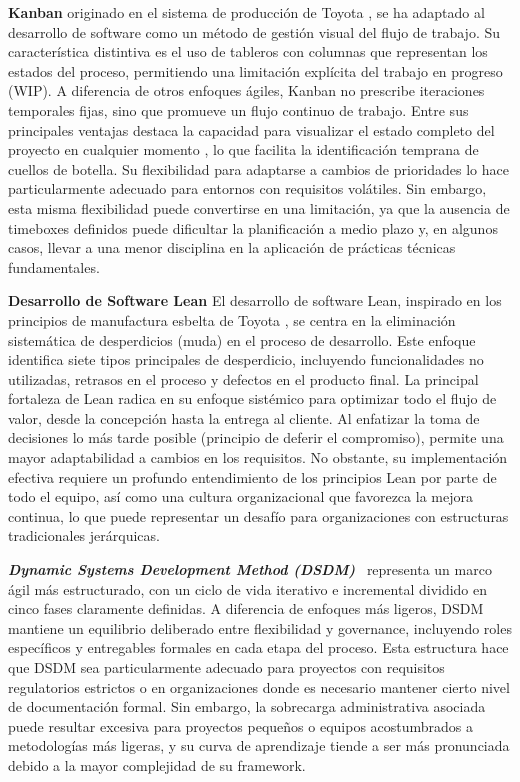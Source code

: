 \textbf{Kanban}
originado en el sistema de producción de Toyota \cite{anderson2010kanban}, se ha adaptado al desarrollo de software como un método de gestión visual del flujo de trabajo. Su característica distintiva es el uso de tableros con columnas que representan los estados del proceso, permitiendo una limitación explícita del trabajo en progreso (WIP). A diferencia de otros enfoques ágiles, Kanban no prescribe iteraciones temporales fijas, sino que promueve un flujo continuo de trabajo. Entre sus principales ventajas destaca la capacidad para visualizar el estado completo del proyecto en cualquier momento \cite{reinertsen2009principles}, lo que facilita la identificación temprana de cuellos de botella. Su flexibilidad para adaptarse a cambios de prioridades lo hace particularmente adecuado para entornos con requisitos volátiles. Sin embargo, esta misma flexibilidad puede convertirse en una limitación, ya que la ausencia de timeboxes definidos puede dificultar la planificación a medio plazo y, en algunos casos, llevar a una menor disciplina en la aplicación de prácticas técnicas fundamentales.

\textbf{Desarrollo de Software Lean}
El desarrollo de software Lean, inspirado en los principios de manufactura esbelta de Toyota \cite{poppendieck2003lean}, se centra en la eliminación sistemática de desperdicios (muda) en el proceso de desarrollo. Este enfoque identifica siete tipos principales de desperdicio, incluyendo funcionalidades no utilizadas, retrasos en el proceso y defectos en el producto final. La principal fortaleza de Lean radica en su enfoque sistémico para optimizar todo el flujo de valor, desde la concepción hasta la entrega al cliente. Al enfatizar la toma de decisiones lo más tarde posible (principio de deferir el compromiso), permite una mayor adaptabilidad a cambios en los requisitos. No obstante, su implementación efectiva requiere un profundo entendimiento de los principios Lean por parte de todo el equipo, así como una cultura organizacional que favorezca la mejora continua, lo que puede representar un desafío para organizaciones con estructuras tradicionales jerárquicas.

\textit{\textbf{Dynamic Systems Development Method (DSDM)}}~\cite{dsdm2014handbook} representa un marco ágil más estructurado, con un ciclo de vida iterativo e incremental dividido en cinco fases claramente definidas. A diferencia de enfoques más ligeros, DSDM mantiene un equilibrio deliberado entre flexibilidad y governance, incluyendo roles específicos y entregables formales en cada etapa del proceso. Esta estructura hace que DSDM sea particularmente adecuado para proyectos con requisitos regulatorios estrictos o en organizaciones donde es necesario mantener cierto nivel de documentación formal. Sin embargo, la sobrecarga administrativa asociada puede resultar excesiva para proyectos pequeños o equipos acostumbrados a metodologías más ligeras, y su curva de aprendizaje tiende a ser más pronunciada debido a la mayor complejidad de su framework.

